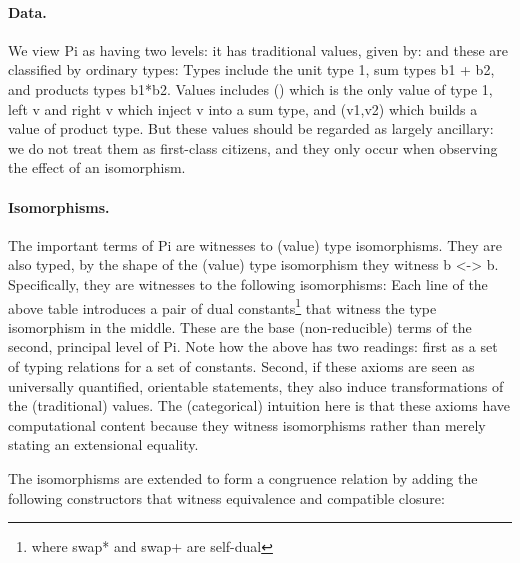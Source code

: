 \documentclass{llncs}
\begin{document}
\paragraph*{Data.}
We view {{Pi}} as having two levels:  it has traditional values, given by:
\noindent and these are classified by ordinary types:
\noindent Types include the unit type {{1}}, sum types {{b1 + b2}}, and
products types {{b1*b2}}.  Values includes {{()}} which is the only value of
type {{1}}, {{left v}} and {{right v}} which inject {{v}} into a sum type,
and {{(v1,v2)}} which builds a value of product type. But these values should
be regarded as largely ancillary: we do not treat them as first-class citizens,
and they only occur when observing the effect of an isomorphism.

\paragraph*{Isomorphisms.} The important terms of {{Pi}} are witnesses to
(value) type isomorphisms.  They are also typed, by the shape of the (value)
type isomorphism they witness {{b <-> b}}.  Specifically, they are witnesses to
the following isomorphisms:
\noindent Each line of the above table introduces a pair of dual
constants\footnote{where {{swap*}} and {{swap+}} are self-dual} that witness
the type isomorphism in the middle.  These are the base (non-reducible) terms
of the second, principal level of {{Pi}}. Note how the above has two
readings: first as a set of typing relations for a set of constants. Second,
if these axioms are seen as universally quantified, orientable statements,
they also induce transformations of the (traditional) values. The
(categorical) intuition here is that these axioms have computational content
because they witness isomorphisms rather than merely stating an extensional
equality.

The isomorphisms are extended to form a congruence relation by adding the
following constructors that witness equivalence and compatible closure:
\end{document}
